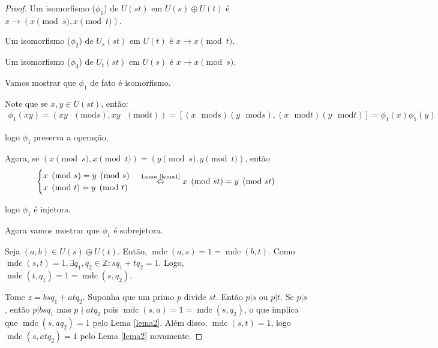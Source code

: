 \documentclass[a4paper,portuguese,11pt,twoside, leqno]{book}
\DeclareMathOperator{\mdc}{mdc}
\theoremstyle{definition}
\begin{document}
	\begin{proof}
		Um isomorfismo ($\phi_1$) de $U(st)$ em $U(s)\oplus U(t)$ é $x\to (x\pmod s, x\pmod t)$.
		\par\vspace{0.3cm} Um isomorfismo ($\phi_2$) de $U_s(st)$ em $U(t)$ é $x\to x\pmod t$.
		\par\vspace{0.3cm} Um isomorfismo ($\phi_3$) de $U_t(st)$ em $U(s)$ é $x\to x\pmod s$.
		\par\vspace{0.3cm} Vamos mostrar que $\phi_1$ de fato é isomorfismo.
		\vspace{0.3cm}\par Note que se $x, y \in U(st)$, então: \begin{align*} \phi_1(xy) = (xy\text{ }(\mathrm{mod} s), xy\text{ }(\mathrm{mod} t)) = [(x\text{ }\mathrm{mod} s)(y\text{ }\mathrm{mod} s), (x\text{ }\mathrm{mod} t)(y\text{ }\mathrm{mod} t)] = \phi_1(x)\phi_1(y)
		\end{align*} 
		\par\vspace{0.3cm}logo $\phi_1$ preserva a operação.
		\par\vspace{0.3cm} Agora, se $(x\pmod s, x\pmod t) = (y\pmod s, y\pmod t)$, então 
		\begin{align*}
		\begin{cases}
		x\pmod s = y\pmod s \\ x\pmod t = y\pmod t
		\end{cases} \overset{\text{Lema \eqref{lema1}}}{\Leftrightarrow } x\pmod {st} = y\pmod {st} 
		\end{align*}
		\par\vspace{0.3cm}logo $\phi_1$ é injetora.
		\par\vspace{0.3cm} Agora vamos mostrar que $\phi_1$ é sobrejetora.
		\par\vspace{0.3cm} Seja $(a,b)\in U(s)\oplus U(t)$. Então, $\mdc(a,s) = 1 = \mdc(b,t)$. Como $\mdc(s,t) = 1, \exists q_1, q_2\in \mathbb{Z}: sq_1 + tq_2 = 1$. Logo, $\mdc(t,q_1) = 1 = \mdc(s,q_2)$. 
		\par\vspace{0.3cm} Tome $z = bsq_1 + atq_2$. Suponha que um primo $p$ divide $st$. Então $p|s$ ou $p|t$. Se $p|s$, então $p|bsq_1$ mas $p\nmid atq_2$ pois $\mdc(s,a) = 1 = \mdc(s,q_2)$, o que implica que $\mdc(s,aq_2) = 1$ pelo Lema \eqref{lema2}. Além disso, $\mdc(s,t) = 1$, logo $\mdc(s,atq_2) = 1$ pelo Lema \eqref{lema2} novamente.

\end{proof}
\end{document}
